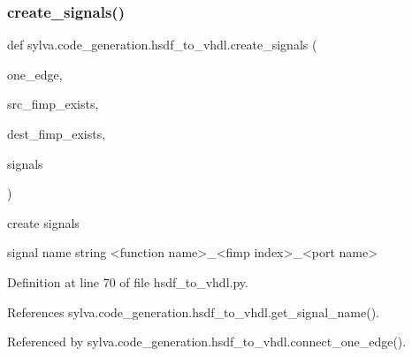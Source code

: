 \mbox{\label{namespacesylva_1_1code__generation_1_1hsdf__to__vhdl_a7b3765f9d22f02a29cb6ecfb267ae7f0}} 
\subsubsection{\texorpdfstring{create\+\_\+signals()}{create\_signals()}}
{\footnotesize\ttfamily def sylva.\+code\+\_\+generation.\+hsdf\+\_\+to\+\_\+vhdl.\+create\+\_\+signals (\begin{DoxyParamCaption}\item[{}]{one\+\_\+edge,  }\item[{}]{src\+\_\+fimp\+\_\+exists,  }\item[{}]{dest\+\_\+fimp\+\_\+exists,  }\item[{}]{signals }\end{DoxyParamCaption})}

\begin{DoxyVerb}create signals

  signal name
    string
    <function name>_<fimp index>_<port name>
\end{DoxyVerb}
 

Definition at line 70 of file hsdf\+\_\+to\+\_\+vhdl.\+py.



References sylva.\+code\+\_\+generation.\+hsdf\+\_\+to\+\_\+vhdl.\+get\+\_\+signal\+\_\+name().



Referenced by sylva.\+code\+\_\+generation.\+hsdf\+\_\+to\+\_\+vhdl.\+connect\+\_\+one\+\_\+edge().


